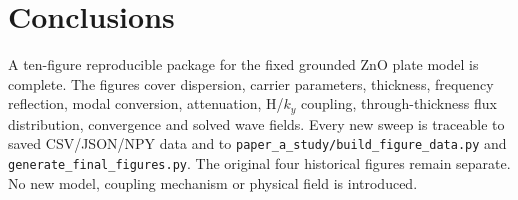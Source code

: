 \section{Conclusions}
\label{sec:conclusions}
A ten-figure reproducible package for the fixed grounded ZnO plate model is complete. The figures cover dispersion, carrier parameters, thickness, frequency reflection, modal conversion, attenuation, H/$k_y$ coupling, through-thickness flux distribution, convergence and solved wave fields. Every new sweep is traceable to saved CSV/JSON/NPY data and to \texttt{paper\_a\_study/build\_figure\_data.py} and \texttt{generate\_final\_figures.py}. The original four historical figures remain separate. No new model, coupling mechanism or physical field is introduced.
